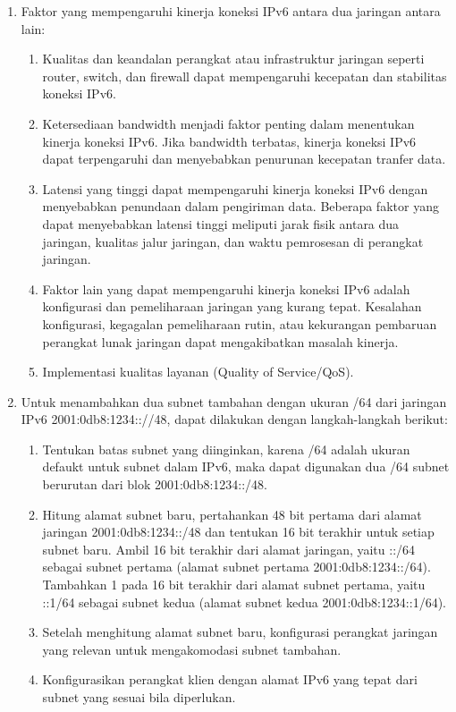 \begin{enumerate}
    \item Faktor yang mempengaruhi kinerja koneksi IPv6 antara dua jaringan antara lain:
    \begin{enumerate}
        \item Kualitas dan keandalan perangkat atau infrastruktur jaringan seperti router, switch, dan firewall dapat mempengaruhi kecepatan dan stabilitas koneksi IPv6.
        \item Ketersediaan bandwidth menjadi faktor penting dalam menentukan kinerja koneksi IPv6. Jika bandwidth terbatas, kinerja koneksi IPv6 dapat terpengaruhi dan menyebabkan penurunan kecepatan tranfer data.
        \item Latensi yang tinggi dapat mempengaruhi kinerja koneksi IPv6 dengan menyebabkan penundaan dalam pengiriman data. Beberapa faktor yang dapat menyebabkan latensi tinggi meliputi jarak fisik antara dua jaringan, kualitas jalur jaringan, dan waktu pemrosesan di perangkat jaringan.
        \item Faktor lain yang dapat mempengaruhi kinerja koneksi IPv6 adalah konfigurasi dan pemeliharaan jaringan yang kurang tepat. Kesalahan konfigurasi, kegagalan pemeliharaan rutin, atau kekurangan pembaruan perangkat lunak jaringan dapat mengakibatkan masalah kinerja.
        \item Implementasi kualitas layanan (Quality of Service/QoS).
    \end{enumerate}
    
    \item Untuk menambahkan dua subnet tambahan dengan ukuran /64 dari jaringan IPv6 2001:0db8:1234:://48, dapat dilakukan dengan langkah-langkah berikut:
    
    \begin{enumerate}
        \item Tentukan batas subnet yang diinginkan, karena /64 adalah ukuran defaukt untuk subnet dalam IPv6, maka dapat digunakan dua /64 subnet berurutan dari blok 2001:0db8:1234::/48.
        \item Hitung alamat subnet baru, pertahankan 48 bit pertama dari alamat jaringan 2001:0db8:1234::/48 dan tentukan 16 bit terakhir untuk setiap subnet baru. Ambil 16 bit terakhir dari alamat jaringan, yaitu ::/64 sebagai subnet pertama (alamat subnet pertama 2001:0db8:1234::/64). Tambahkan 1 pada 16 bit terakhir dari alamat subnet pertama, yaitu ::1/64 sebagai subnet kedua (alamat subnet kedua 2001:0db8:1234::1/64).
        \item Setelah menghitung alamat subnet baru, konfigurasi perangkat jaringan yang relevan untuk mengakomodasi subnet tambahan.
        \item Konfigurasikan perangkat klien dengan alamat IPv6 yang tepat dari subnet yang sesuai bila diperlukan.
        

\end{enumerate}
\end{enumerate}

